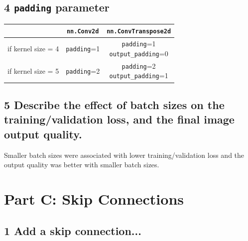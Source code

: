 \documentclass{article}
\begin{document}
\subsection*{4 \texttt{padding} parameter}

\begin{tabular}{ c c c }
	 & \texttt{nn.Conv2d}  & \texttt{nn.ConvTranspose2d} \\ 
	 \hline
	if kernel size = 4 & \texttt{padding}=1 & \makecell{\texttt{padding}=1 \\ \texttt{output\_padding}=0} \\  
	if kernel size = 5 & \texttt{padding}=2 & \makecell{\texttt{padding}=2 \\ \texttt{output\_padding}=1}
\end{tabular}


\subsection*{5 Describe  the  effect  of  batch  sizes  on  the  training/validation loss, and the final image output quality.}

Smaller batch sizes were associated with lower training/validation loss and the output quality was better with smaller batch sizes. 


\clearpage
\section*{Part C: Skip Connections}

\subsection*{1 Add a skip connection...}
\end{document}
